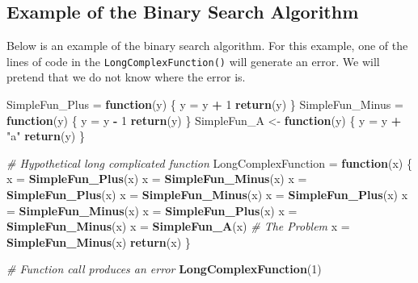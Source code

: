\documentclass[
]{book}
\newenvironment{Shaded}{\begin{snugshade}}{\end{snugshade}}
\newcommand{\CommentTok}[1]{\textcolor[rgb]{0.56,0.35,0.01}{\textit{#1}}}
\newcommand{\ControlFlowTok}[1]{\textcolor[rgb]{0.13,0.29,0.53}{\textbf{#1}}}
\newcommand{\DecValTok}[1]{\textcolor[rgb]{0.00,0.00,0.81}{#1}}
\newcommand{\KeywordTok}[1]{\textcolor[rgb]{0.13,0.29,0.53}{\textbf{#1}}}
\newcommand{\NormalTok}[1]{#1}
\newcommand{\OperatorTok}[1]{\textcolor[rgb]{0.81,0.36,0.00}{\textbf{#1}}}
\newcommand{\StringTok}[1]{\textcolor[rgb]{0.31,0.60,0.02}{#1}}
\begin{document}
\hypertarget{example-of-the-binary-search-algorithm}{%
\subsection{Example of the Binary Search Algorithm}\label{example-of-the-binary-search-algorithm}}

Below is an example of the binary search algorithm. For this example, one of the lines of code in the \texttt{LongComplexFunction()} will generate an error. We will pretend that we do not know where the error is.

\begin{Shaded}
\begin{Highlighting}[]
\NormalTok{SimpleFun_Plus =}\StringTok{ }\ControlFlowTok{function}\NormalTok{(y) \{}
\NormalTok{    y =}\StringTok{ }\NormalTok{y }\OperatorTok{+}\StringTok{ }\DecValTok{1}
    \KeywordTok{return}\NormalTok{(y)}
\NormalTok{\}}
\NormalTok{SimpleFun_Minus =}\StringTok{ }\ControlFlowTok{function}\NormalTok{(y) \{}
\NormalTok{    y =}\StringTok{ }\NormalTok{y }\OperatorTok{-}\StringTok{ }\DecValTok{1}
    \KeywordTok{return}\NormalTok{(y)}
\NormalTok{\}}
\NormalTok{SimpleFun_A <-}\StringTok{ }\ControlFlowTok{function}\NormalTok{(y) \{}
\NormalTok{    y =}\StringTok{ }\NormalTok{y }\OperatorTok{+}\StringTok{ "a"}
    \KeywordTok{return}\NormalTok{(y)}
\NormalTok{\}}



\CommentTok{# Hypothetical long complicated function}
\NormalTok{LongComplexFunction =}\StringTok{ }\ControlFlowTok{function}\NormalTok{(x) \{}
\NormalTok{    x =}\StringTok{ }\KeywordTok{SimpleFun_Plus}\NormalTok{(x)}
\NormalTok{    x =}\StringTok{ }\KeywordTok{SimpleFun_Minus}\NormalTok{(x)}
\NormalTok{    x =}\StringTok{ }\KeywordTok{SimpleFun_Plus}\NormalTok{(x)}
\NormalTok{    x =}\StringTok{ }\KeywordTok{SimpleFun_Minus}\NormalTok{(x)}
\NormalTok{    x =}\StringTok{ }\KeywordTok{SimpleFun_Plus}\NormalTok{(x)}
\NormalTok{    x =}\StringTok{ }\KeywordTok{SimpleFun_Minus}\NormalTok{(x)}
\NormalTok{    x =}\StringTok{ }\KeywordTok{SimpleFun_Plus}\NormalTok{(x)}
\NormalTok{    x =}\StringTok{ }\KeywordTok{SimpleFun_Minus}\NormalTok{(x)}
\NormalTok{    x =}\StringTok{ }\KeywordTok{SimpleFun_A}\NormalTok{(x)  }\CommentTok{# The Problem }
\NormalTok{    x =}\StringTok{ }\KeywordTok{SimpleFun_Minus}\NormalTok{(x)}
    \KeywordTok{return}\NormalTok{(x)}
\NormalTok{\}}

\CommentTok{# Function call produces an error}
\KeywordTok{LongComplexFunction}\NormalTok{(}\DecValTok{1}\NormalTok{)}
\end{Highlighting}
\end{Shaded}
\end{document}
